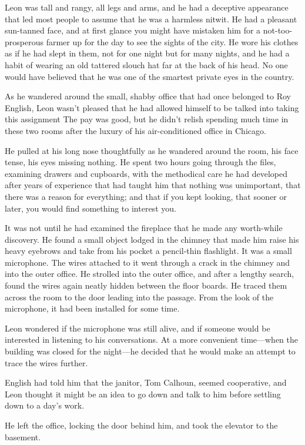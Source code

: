 \documentclass{novel}
\begin{document}
Leon was tall and rangy, all legs and arms, and he had a deceptive appearance that led most people to assume that he was a harmless nitwit. He had a pleasant sun-tanned face, and at first glance you might have mistaken him for a not-too-prosperous farmer up for the day to see the sights of the city. He wore his clothes as if he had slept in them, not for one night but for many nights, and he had a habit of wearing an old tattered slouch hat far at the back of his head. No one would have believed that he was one of the smartest private eyes in the country.

As he wandered around the small, shabby office that had once belonged to Roy English, Leon wasn't pleased that he had allowed himself to be talked into taking this assignment The pay was good, but he didn't relish spending much time in these two rooms after the luxury of his air-conditioned office in Chicago.

He pulled at his long nose thoughtfully as he wandered around the room, his face tense, his eyes missing nothing. He spent two hours going through the files, examining drawers and cupboards, with the methodical care he had developed after years of experience that had taught him that nothing was unimportant, that there was a reason for everything; and that if you kept looking, that sooner or later, you would find something to interest you.

It was not until he had examined the fireplace that he made any worth-while discovery. He found a small object lodged in the chimney that made him raise his heavy eyebrows and take from his pocket a pencil-thin flashlight. It was a small microphone. The wires attached to it went through a crack in the chimney and into the outer office. He strolled into the outer office, and after a lengthy search, found the wires again neatly hidden between the floor boards. He traced them across the room to the door leading into the passage. From the look of the microphone, it had been installed for some time.

Leon wondered if the microphone was still alive, and if someone would be interested in listening to his conversations. At a more convenient time—when the building was closed for the night—he decided that he would make an attempt to trace the wires further.

English had told him that the janitor, Tom Calhoun, seemed cooperative, and Leon thought it might be an idea to go down and talk to him before settling down to a day's work.

He left the office, locking the door behind him, and took the elevator to the basement.
\end{document}
